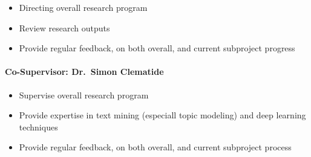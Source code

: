 \begin{itemize}
	\item Directing overall research program
	\item Review research outputs
	\item Provide regular feedback, on both overall, and current subproject progress
\end{itemize}

\paragraph{Co-Supervisor: Dr.~Simon Clematide}

\begin{itemize}
	\item Supervise overall research program
	\item Provide expertise in text mining (especiall topic modeling) and deep learning techniques
	\item Provide regular feedback, on both overall, and current subproject process
\end{itemize}